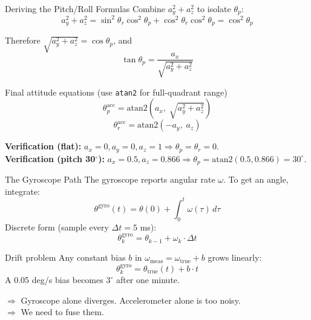 \documentclass[10pt]{beamer}
\begin{document}
\begin{frame}{Deriving the Pitch/Roll Formulas}
  Combine $a_y^2 + a_z^2$ to isolate $\theta_p$:
  \[
    a_y^2 + a_z^2 = \sin^2\theta_r\cos^2\theta_p + \cos^2\theta_r\cos^2\theta_p = \cos^2\theta_p
  \]

  Therefore $\sqrt{a_y^2+a_z^2} = \cos\theta_p$, and
  \[
    \tan\theta_p = \frac{a_x}{\sqrt{a_y^2+a_z^2}}
  \]

  \begin{block}{Final attitude equations (use \texttt{atan2} for full-quadrant range)}
    \[
      \theta_p^{\text{acc}} = \mathrm{atan2}\!\left(a_x,\; \sqrt{a_y^2 + a_z^2}\right)
    \]
    \[
      \theta_r^{\text{acc}} = \mathrm{atan2}\!\left(-a_y,\; a_z\right)
    \]
  \end{block}

  \scriptsize
  \textbf{Verification (flat):} $a_x{=}0, a_y{=}0, a_z{=}1 \Rightarrow \theta_p = \theta_r = 0$. \checkmark\\
  \textbf{Verification (pitch 30$^\circ$):} $a_x{=}0.5, a_z{=}0.866 \Rightarrow \theta_p = \mathrm{atan2}(0.5, 0.866) = 30^\circ$. \checkmark
\end{frame}

\begin{frame}{The Gyroscope Path}
  The gyroscope reports angular rate $\omega$. To get an angle, integrate:
  \[
    \theta^{\text{gyro}}(t) = \theta(0) + \int_0^t \omega(\tau)\,d\tau
  \]
  Discrete form (sample every $\Delta t = 5$ ms):
  \[
    \theta_k^{\text{gyro}} = \theta_{k-1} + \omega_k \cdot \Delta t
  \]

  \begin{block}{Drift problem}
    Any constant bias $b$ in $\omega_{\text{meas}} = \omega_{\text{true}} + b$ grows linearly:
    \[
      \theta_k^{\text{gyro}} = \theta_{\text{true}}(t) + b\cdot t
    \]
    A 0.05 deg/s bias becomes $3^\circ$ after one minute.
  \end{block}

  $\Rightarrow$ Gyroscope alone diverges. Accelerometer alone is too noisy.\\
  $\Rightarrow$ We need to fuse them.
\end{frame}
\end{document}
